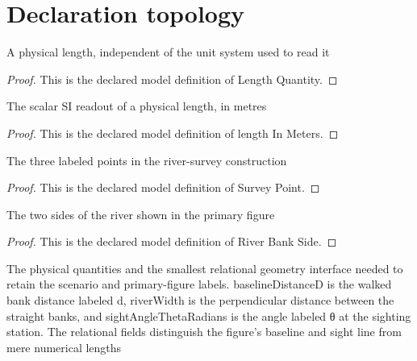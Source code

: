\section{Declaration topology}
\begin{definition}
  \label{def:physics:phyx-mini-0676:phyxminiproblems-problemphyxmini0676-lengthquantity}
  A physical length, independent of the unit system used to read it
\end{definition}
\begin{proof}
  This is the declared model definition of Length Quantity.
\end{proof}
\begin{definition}
  \label{def:physics:phyx-mini-0676:phyxminiproblems-problemphyxmini0676-lengthinmeters}
  The scalar SI readout of a physical length, in metres
\end{definition}
\begin{proof}
  This is the declared model definition of length In Meters.
\end{proof}
\begin{definition}
  \label{def:physics:phyx-mini-0676:phyxminiproblems-problemphyxmini0676-surveypoint}
  The three labeled points in the river-survey construction
\end{definition}
\begin{proof}
  This is the declared model definition of Survey Point.
\end{proof}
\begin{definition}
  \label{def:physics:phyx-mini-0676:phyxminiproblems-problemphyxmini0676-riverbankside}
  The two sides of the river shown in the primary figure
\end{definition}
\begin{proof}
  This is the declared model definition of River Bank Side.
\end{proof}
\begin{definition}
  \label{def:physics:phyx-mini-0676:phyxminiproblems-problemphyxmini0676-riversurveysetup}
  The physical quantities and the smallest relational geometry interface needed to retain the scenario and primary-figure labels. baselineDistanceD is the walked bank distance labeled d, riverWidth is the perpendicular distance between the straight banks, and sightAngleThetaRadians is the angle labeled θ at the sighting station. The relational fields distinguish the figure's baseline and sight line from mere numerical lengths
\end{definition}
